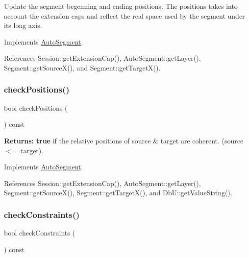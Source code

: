 Update the segment begenning and ending positions. The positions takes into account the extension caps and reflect the real space used by the segment under it\textquotesingle{}s long axis. 

Implements \hyperlink{classKatabatic_1_1AutoSegment_a6d95f4de39c13611786c95ddc7b8942e}{Auto\+Segment}.



References Session\+::get\+Extension\+Cap(), Auto\+Segment\+::get\+Layer(), Segment\+::get\+Source\+X(), and Segment\+::get\+Target\+X().

\mbox{\label{classKatabatic_1_1AutoHorizontal_a6575c17bfa589c087215c87678e5719c}} 
\subsubsection{\texorpdfstring{check\+Positions()}{checkPositions()}}
{\footnotesize\ttfamily bool check\+Positions (\begin{DoxyParamCaption}{ }\end{DoxyParamCaption}) const\hspace{0.3cm}{\ttfamily [virtual]}}

{\bfseries Returns\+:} {\bfseries true} if the relative positions of source \& target are coherent. (source $<$= target). 

Implements \hyperlink{classKatabatic_1_1AutoSegment_af026a81002bd907f1ccd4a4784aaa1db}{Auto\+Segment}.



References Session\+::get\+Extension\+Cap(), Auto\+Segment\+::get\+Layer(), Segment\+::get\+Source\+X(), Segment\+::get\+Target\+X(), and Db\+U\+::get\+Value\+String().

\mbox{\label{classKatabatic_1_1AutoHorizontal_a8aef8f4bbafe3426840f9ebf31bb3b81}} 
\subsubsection{\texorpdfstring{check\+Constraints()}{checkConstraints()}}
{\footnotesize\ttfamily bool check\+Constraints (\begin{DoxyParamCaption}{ }\end{DoxyParamCaption}) const\hspace{0.3cm}{\ttfamily [virtual]}}

